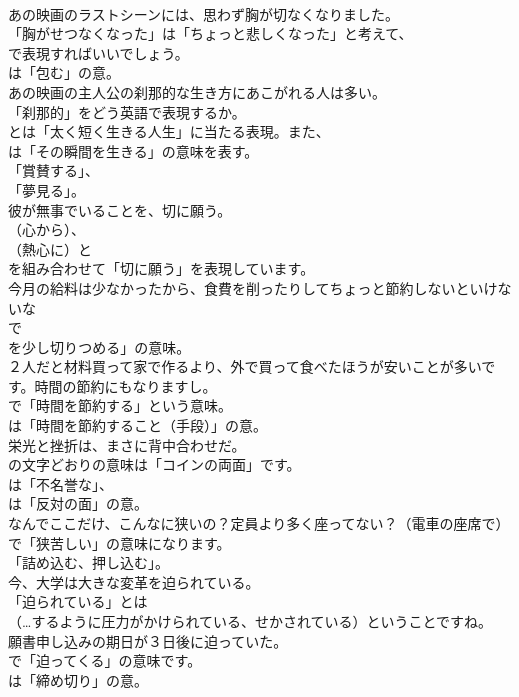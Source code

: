 \documentclass[8pt]{extreport}
\begin{document}
\begin{CJK}{UTF8}{min}
\\	あの映画のラストシーンには、思わず胸が切なくなりました。 
\\	「胸がせつなくなった」は「ちょっと悲しくなった」と考えて、
\\	で表現すればいいでしょう。
\\	は「包む」の意。	
\\	あの映画の主人公の刹那的な生き方にあこがれる人は多い。 
\\	「刹那的」をどう英語で表現するか。
\\	とは「太く短く生きる人生」に当たる表現。また、
\\	は「その瞬間を生きる」の意味を表す。
\\	「賞賛する」、
\\	「夢見る」。	
\\	彼が無事でいることを、切に願う。 
\\	（心から）、
\\	（熱心に）と 
\\	を組み合わせて「切に願う」を表現しています。	
\\	今月の給料は少なかったから、食費を削ったりしてちょっと節約しないといけないな 
\\	で
\\	を少し切りつめる」の意味。	
\\	２人だと材料買って家で作るより、外で買って食べたほうが安いことが多いです。時間の節約にもなりますし。 
\\	で「時間を節約する」という意味。
\\	は「時間を節約すること（手段）」の意。	
\\	栄光と挫折は、まさに背中合わせだ。 
\\	の文字どおりの意味は「コインの両面」です。
\\	は「不名誉な」、
\\	は「反対の面」の意。	
\\	なんでここだけ、こんなに狭いの？定員より多く座ってない？（電車の座席で） 
\\	で「狭苦しい」の意味になります。
\\	「詰め込む、押し込む」。	
\\	今、大学は大きな変革を迫られている。 
\\	「迫られている」とは
\\	（…するように圧力がかけられている、せかされている）ということですね。	
\\	願書申し込みの期日が３日後に迫っていた。 
\\	で「迫ってくる」の意味です。
\\	は「締め切り」の意。	

\end{CJK}
\end{document}
